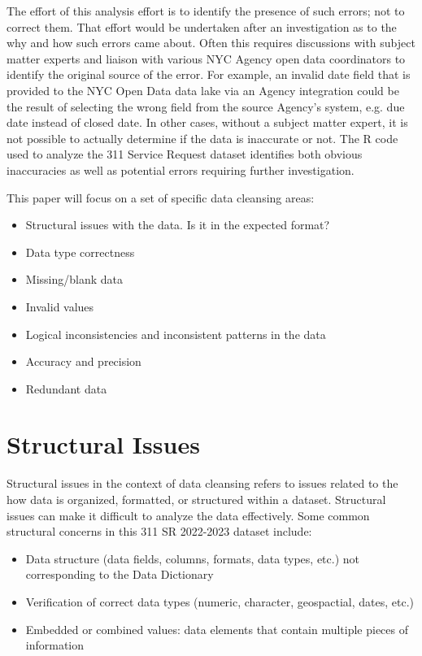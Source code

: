 \documentclass[12pt, titlepage]{article}
\begin{document}
The effort of this analysis effort is to identify the presence of such errors; not to correct them. That effort would be undertaken after an investigation as to the why
and how such errors came about. Often this requires discussions with subject matter experts and liaison with various NYC Agency open data coordinators
to identify the original source of the error. For example, an invalid date field that is provided to the NYC Open Data data lake via an Agency integration could
be the result of selecting the wrong field from the source Agency's system, e.g. due date instead of closed date. In other cases, without a subject matter
expert, it is not possible to actually determine if the data is inaccurate or not. The R code used to analyze the 311 Service Request dataset identifies
both obvious inaccuracies as well as potential errors requiring further investigation.

This paper will focus on a set of specific data cleansing areas:

\begin{itemize}
	\item Structural issues with the data. Is it in the expected format?
	\item Data type correctness
	\item Missing/blank data
	\item Invalid values
	\item Logical inconsistencies and inconsistent patterns in the data
	\item Accuracy and precision
	\item Redundant data  
\end{itemize}


\section{Structural Issues}

Structural issues in the context of data cleansing refers to issues related to the how data is organized, formatted, or structured within a dataset. Structural issues 
can make it difficult to analyze the data effectively. Some common structural concerns in this 311 SR 2022-2023 dataset include:

\begin{itemize}
	\item Data structure (data fields, columns, formats, data types, etc.) not corresponding to the Data Dictionary
	\item Verification of correct data types (numeric, character, geospactial, dates, etc.)
	\item Embedded or combined values: data elements that contain multiple pieces of information 
\end{itemize}
\end{document}
